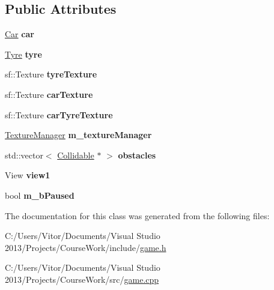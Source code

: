 \subsection*{Public Attributes}
\begin{DoxyCompactItemize}
\item 
\hypertarget{class_game_a6ffa56dab840e2653349ede6ce614140}{}\hyperlink{class_car}{Car} {\bfseries car}\label{class_game_a6ffa56dab840e2653349ede6ce614140}

\item 
\hypertarget{class_game_ab252b56dc27c994d6dc5a8f5638daa85}{}\hyperlink{class_tyre}{Tyre} {\bfseries tyre}\label{class_game_ab252b56dc27c994d6dc5a8f5638daa85}

\item 
\hypertarget{class_game_aaf6429d471b11941257c8d903b68996b}{}sf\+::\+Texture {\bfseries tyre\+Texture}\label{class_game_aaf6429d471b11941257c8d903b68996b}

\item 
\hypertarget{class_game_acdbea4b17782cba40ceaa507efcd6dec}{}sf\+::\+Texture {\bfseries car\+Texture}\label{class_game_acdbea4b17782cba40ceaa507efcd6dec}

\item 
\hypertarget{class_game_a3f2b0a7afbf3a730037b90438153db3d}{}sf\+::\+Texture {\bfseries car\+Tyre\+Texture}\label{class_game_a3f2b0a7afbf3a730037b90438153db3d}

\item 
\hypertarget{class_game_a94c6c539072f8c5231ad8a905e2eb432}{}\hyperlink{class_texture_manager}{Texture\+Manager} {\bfseries m\+\_\+texture\+Manager}\label{class_game_a94c6c539072f8c5231ad8a905e2eb432}

\item 
\hypertarget{class_game_a2d24cc02e4fef7bba277038a2daabf41}{}std\+::vector$<$ \hyperlink{class_collidable}{Collidable} $\ast$ $>$ {\bfseries obstacles}\label{class_game_a2d24cc02e4fef7bba277038a2daabf41}

\item 
\hypertarget{class_game_a423f23c4ffc94a67afd51a6752d8eb58}{}View {\bfseries view1}\label{class_game_a423f23c4ffc94a67afd51a6752d8eb58}

\item 
\hypertarget{class_game_a55cbee6e0e0fc4080a234e8c230d9001}{}bool {\bfseries m\+\_\+b\+Paused}\label{class_game_a55cbee6e0e0fc4080a234e8c230d9001}

\end{DoxyCompactItemize}


The documentation for this class was generated from the following files\+:\begin{DoxyCompactItemize}
\item 
C\+:/\+Users/\+Vitor/\+Documents/\+Visual Studio 2013/\+Projects/\+Course\+Work/include/\hyperlink{game_8h}{game.\+h}\item 
C\+:/\+Users/\+Vitor/\+Documents/\+Visual Studio 2013/\+Projects/\+Course\+Work/src/\hyperlink{game_8cpp}{game.\+cpp}\end{DoxyCompactItemize}

